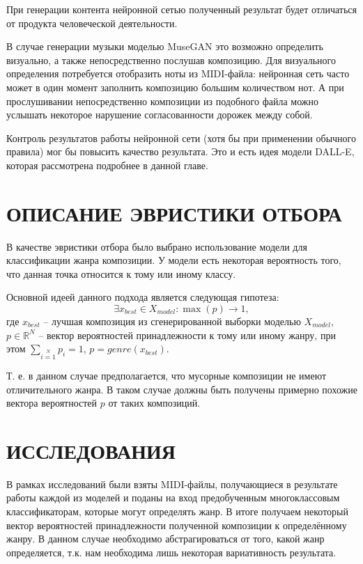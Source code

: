 При генерации контента нейронной сетью полученный результат будет отличаться от продукта человеческой деятельности.

В случае генерации музыки моделью MuseGAN это возможно определить визуально, а также непосредственно послушав композицию. Для визуального определения потребуется отобразить ноты из MIDI-файла: нейронная сеть часто может в один момент заполнить композицию большим количеством нот. А при прослушивании непосредственно композиции из подобного файла можно услышать некоторое нарушение согласованности дорожек между собой.

Контроль результатов работы нейронной сети (хотя бы при применении обычного правила) мог бы повысить качество результата. Это и есть идея модели DALL-E, которая рассмотрена подробнее в данной главе.

\section{ОПИСАНИЕ ЭВРИСТИКИ ОТБОРА}
    В качестве эвристики отбора было выбрано использование модели для классификации жанра композиции. У модели есть некоторая вероятность того, что данная точка относится к тому или иному классу.
    
    Основной идеей данного подхода является следующая гипотеза:
    $$ \exists x_{best} \in X_{model}: \max (p) \to 1, $$
    где $x_{best}$ -- лучшая композиция из сгенерированной выборки моделью $X_{model}$, $p \in \mathbb{R}^{N}$ -- вектор вероятностей принадлежности к тому или иному жанру, при этом $\sum\limits_{i=1}\limits^{N} p_i = 1$, $p = genre(x_{best})$.
    
    Т. е. в данном случае предполагается, что мусорные композиции не имеют отличительного жанра. В таком случае должны быть получены примерно похожие вектора вероятностей $p$ от таких композиций.

\section{ИССЛЕДОВАНИЯ}    
    В рамках исследований были взяты MIDI-файлы, получающиеся в результате работы каждой из моделей и поданы на вход предобученным многоклассовым классификаторам, которые могут определять жанр. В итоге получаем некоторый вектор вероятностей принадлежности полученной композиции к определённому жанру. В данном случае необходимо абстрагироваться от того, какой жанр определяется, т.к. нам необходима лишь некоторая вариативность результата.
    

